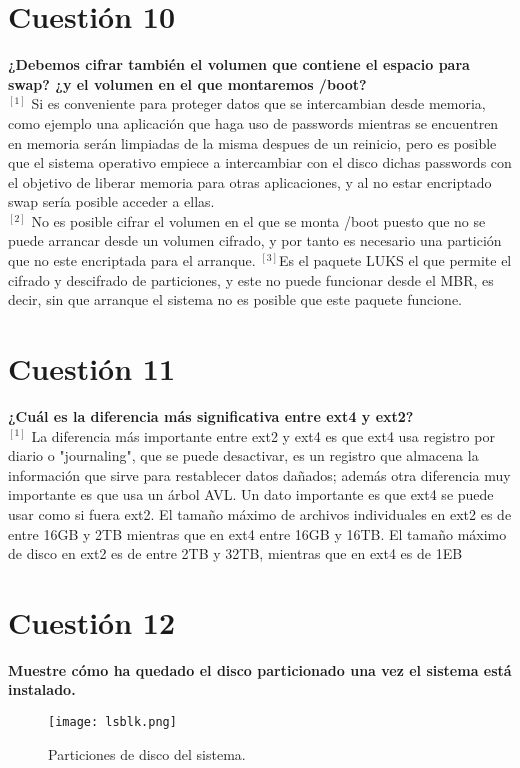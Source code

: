 \documentclass[a4paper, 11pt]{article} %
\begin{document}
\section{Cuestión 10}
\textbf{¿Debemos cifrar también el volumen que contiene el espacio para swap? ¿y el volumen en el que montaremos /boot?
}\\ 
$^{[1]}$  Si es conveniente para proteger datos que se intercambian desde memoria, como ejemplo una aplicación que haga uso de passwords mientras se encuentren en memoria serán limpiadas de la misma despues de un reinicio, pero es posible que el sistema operativo empiece a intercambiar con el disco dichas passwords con el objetivo de liberar memoria para otras aplicaciones, y al no estar encriptado swap sería posible acceder a ellas.
\\$^{[2]}$  No es posible cifrar el volumen en el que se monta /boot puesto que no se puede arrancar desde un volumen cifrado, y por tanto es necesario una partición que no este encriptada para el arranque. $^{[3]}$Es el paquete LUKS el que permite el cifrado y descifrado de particiones, y este no puede funcionar desde el MBR, es decir, sin que arranque el sistema no es posible que este paquete funcione.

\section{Cuestión 11}
\textbf{¿Cuál es la diferencia más significativa entre ext4 y ext2?}\\
$^{[1]}$ La diferencia más importante entre ext2 y ext4 es que ext4 usa registro por diario o "journaling", que se puede desactivar, es un registro que almacena la información que sirve para restablecer datos dañados; además otra diferencia muy importante es que usa un árbol AVL. Un dato importante es que ext4 se puede usar como si fuera ext2.  El tamaño máximo de archivos individuales en ext2 es de entre 16GB y 2TB mientras que en ext4 entre 16GB y 16TB. El tamaño máximo de disco en ext2 es de entre 2TB y 32TB, mientras que en ext4 es de 1EB

\pagebreak

\section{Cuestión 12}
\textbf{Muestre cómo ha quedado el disco particionado una vez el sistema está instalado.}\\
\begin{figure}[h]
\centering 
\texttt{[image: lsblk.png]} 
\caption{Particiones de disco del sistema.} 
\label{contexto:figura} 
\end{figure}
\end{document}
